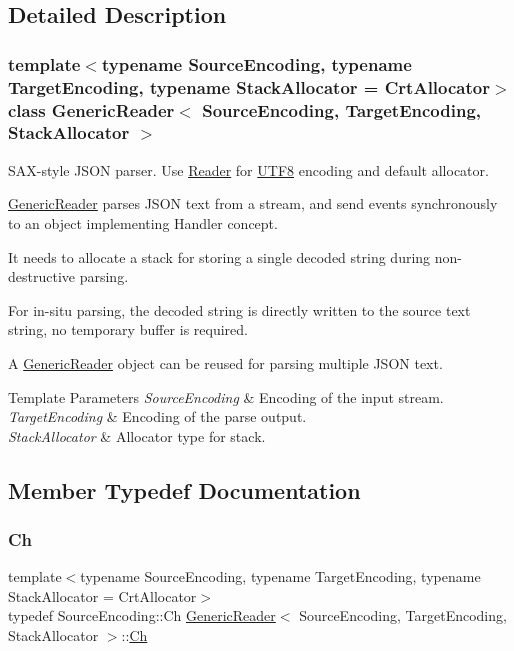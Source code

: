 \subsection{Detailed Description}
\subsubsection*{template$<$typename Source\+Encoding, typename Target\+Encoding, typename Stack\+Allocator = Crt\+Allocator$>$\newline
class Generic\+Reader$<$ Source\+Encoding, Target\+Encoding, Stack\+Allocator $>$}

S\+A\+X-\/style J\+S\+ON parser. Use \hyperlink{reader_8h_a84f3b66a66647f4ac4267078359188ba}{Reader} for \hyperlink{structUTF8}{U\+T\+F8} encoding and default allocator. 

\hyperlink{classGenericReader}{Generic\+Reader} parses J\+S\+ON text from a stream, and send events synchronously to an object implementing Handler concept.

It needs to allocate a stack for storing a single decoded string during non-\/destructive parsing.

For in-\/situ parsing, the decoded string is directly written to the source text string, no temporary buffer is required.

A \hyperlink{classGenericReader}{Generic\+Reader} object can be reused for parsing multiple J\+S\+ON text.


\begin{DoxyTemplParams}{Template Parameters}
{\em Source\+Encoding} & Encoding of the input stream. \\
\hline
{\em Target\+Encoding} & Encoding of the parse output. \\
\hline
{\em Stack\+Allocator} & Allocator type for stack. \\
\hline
\end{DoxyTemplParams}


\subsection{Member Typedef Documentation}
\mbox{\label{classGenericReader_ab39a92bb26d50aee6469df604622218a}} 
\subsubsection{\texorpdfstring{Ch}{Ch}}
{\footnotesize\ttfamily template$<$typename Source\+Encoding, typename Target\+Encoding, typename Stack\+Allocator = Crt\+Allocator$>$ \\
typedef Source\+Encoding\+::\+Ch \hyperlink{classGenericReader}{Generic\+Reader}$<$ Source\+Encoding, Target\+Encoding, Stack\+Allocator $>$\+::\hyperlink{classGenericReader_ab39a92bb26d50aee6469df604622218a}{Ch}}



